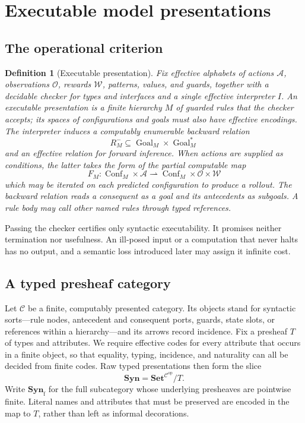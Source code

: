 \documentclass[11pt]{article}
\newtheorem{definition}[theorem]{Definition}
\newcommand{\Syn}{\mathbf{Syn}}
\begin{document}
\section{Executable model presentations}

\subsection{The operational criterion}

\begin{definition}[Executable presentation]
Fix effective alphabets of actions \(\mathcal A\), observations \(\mathcal O\),
rewards \(\mathcal W\), patterns, values, and guards, together with a decidable
checker for types and interfaces and a single effective interpreter \(I\).  An
\emph{executable presentation} is a finite hierarchy \(M\) of guarded rules
that the checker accepts; its spaces of configurations and goals must also have
effective encodings.  The interpreter induces a computably enumerable
backward relation
\[
 R_M^-\subseteq
 \operatorname{Goal}_M\times\operatorname{Goal}_M^*
\]
and an effective relation for forward inference.  When actions are supplied as
conditions, the latter takes the form of the partial computable map
\[
 F_M:\operatorname{Conf}_M\times\mathcal A
       \rightharpoonup
       \operatorname{Conf}_M\times\mathcal O\times\mathcal W
\]
which may be iterated on each predicted configuration to produce a rollout.
The backward relation reads a consequent as a goal and its antecedents as
subgoals.  A rule body may call other named rules through typed references.
\end{definition}

Passing the checker certifies only syntactic executability.  It promises neither
termination nor usefulness.  An ill-posed input or a computation that never
halts has no output, and a semantic loss introduced later may assign it
infinite cost.

\subsection{A typed presheaf category}

Let \(\mathcal C\) be a finite, computably presented category.  Its objects
stand for syntactic sorts---rule nodes, antecedent and consequent ports,
guards, state slots, or references within a hierarchy---and its arrows record
incidence.  Fix a presheaf \(T\) of types and attributes.  We require effective
codes for every attribute that occurs in a finite object, so that equality,
typing, incidence, and naturality can all be decided from finite codes.  Raw
typed presentations then form the slice
\[
 \Syn=\mathbf{Set}^{\mathcal C^{\mathrm{op}}}/T.
\]
Write \(\Syn_{\mathrm f}\) for the full subcategory whose underlying presheaves
are pointwise finite.  Literal names and attributes that must be preserved are
encoded in the map to \(T\), rather than left as informal decorations.
\end{document}
